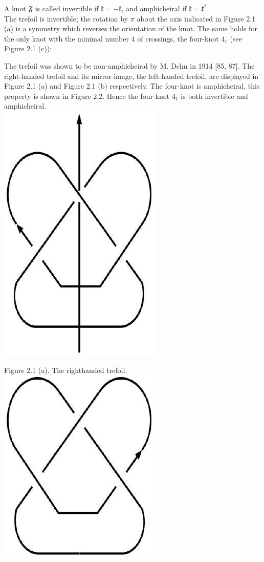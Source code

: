 \documentclass[10pt, letterpaper]{article}
\begin{document}
A knot $\mathfrak{F}$ is called invertible if $\mathfrak{k}=-\mathfrak{k}$, and amphicheiral if $\mathfrak{k}=\mathfrak{k}^{*}$.\\
The trefoil is invertible; the rotation by $\pi$ about the axis indicated in Figure 2.1 (a) is a symmetry which reverses the orientation of the knot. The same holds for the only knot with the minimal number 4 of crossings, the four-knot $4_{1}$ (see Figure 2.1 (c)):

The trefoil was shown to be non-amphicheiral by M. Dehn in 1914 [85, 87]. The right-handed trefoil and its mirror-image, the left-handed trefoil, are displayed in Figure 2.1 (a) and Figure 2.1 (b) respectively. The four-knot is amphicheiral, this property is shown in Figure 2.2. Hence the four-knot $4_{1}$ is both invertible and amphicheiral.\\
\includegraphics[scale=0.2, center]{2025_05_21_9c06be8de7a55410f8c1g-030}

Figure 2.1 (a). The righthanded trefoil.\\
\includegraphics[scale=0.2, center]{2025_05_21_9c06be8de7a55410f8c1g-030(2)}
\end{document}

